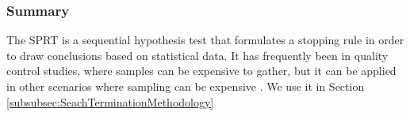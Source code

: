 \subsubsection{Summary}
The SPRT is a sequential hypothesis test that formulates a stopping rule in order to draw conclusions based on statistical data. It has frequently been in quality control studies, where samples can be expensive to gather, but it can be applied in other scenarios where sampling can be expensive \cite{Ou2010AnMean}. We use it in Section \ref{subsubsec:SeachTerminationMethodology}